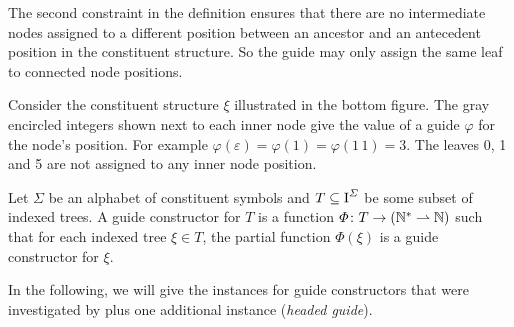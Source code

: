 \documentclass[../document.tex]{subfiles}
\begin{document}
    The second constraint in the definition ensures that there are no intermediate nodes assigned to a different position between an ancestor and an antecedent position in the constituent structure.
    So the guide may only assign the same leaf to connected node positions.

    \begin{example}
        Consider the constituent structure \(\xi\) illustrated in the bottom figure.
        The gray encircled integers shown next to each inner node give the value of a guide \(\varphi\) for the node's position.
        For example \(\varphi(\varepsilon) = \varphi(1) = \varphi(1\,1) = 3\).
        The leaves 0, 1 and 5 are not assigned to any inner node position.

        \begin{center}
          
        \end{center}
    \end{example}

    \begin{definition}
        Let \(\varSigma\) be an alphabet of constituent symbols and \(T \subseteq \operatorname{I}^\varSigma\) be some subset of indexed trees.
        A guide constructor for \(T\) is a function \(\varPhi\colon T \to (\mathbb{N}^* \rightharpoonup \mathbb{N})\) such that for each indexed tree \(\xi \in T\), the partial function \(\varPhi(\xi)\) is a guide constructor for \(\xi\).
    \end{definition}

    In the following, we will give the instances for guide constructors that were investigated by \citet{Rup22} plus one additional instance (\emph{headed guide}).
\end{document}
